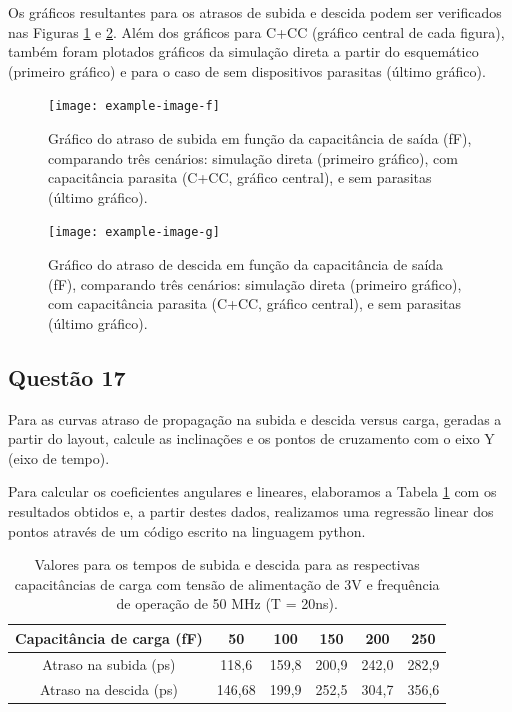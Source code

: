 \documentclass[12pt,a4paper]{article}
\begin{document}
Os gráficos resultantes para os atrasos de subida e descida podem ser verificados nas Figuras \ref{fig:delay_subida_cc} e \ref{fig:delay_descida_cc}. Além dos gráficos para C+CC (gráfico central de cada figura), também foram plotados gráficos da simulação direta a partir do esquemático (primeiro gráfico) e para o caso de sem dispositivos parasitas (último gráfico).

\begin{figure}[H]
    \centering
    \texttt{[image: example-image-f]}
    \caption{Gráfico do atraso de subida em função da capacitância de saída (fF), comparando três cenários: simulação direta (primeiro gráfico), com capacitância parasita (C+CC, gráfico central), e sem parasitas (último gráfico).}
    \label{fig:delay_subida_cc}
\end{figure}

\begin{figure}[H]
    \centering
    \texttt{[image: example-image-g]}
    \caption{Gráfico do atraso de descida em função da capacitância de saída (fF), comparando três cenários: simulação direta (primeiro gráfico), com capacitância parasita (C+CC, gráfico central), e sem parasitas (último gráfico).}
    \label{fig:delay_descida_cc}
\end{figure}

\subsection*{Questão 17}

Para as curvas atraso de propagação na subida e descida versus carga, geradas a partir do layout, calcule as inclinações e os pontos de cruzamento com o eixo Y (eixo de tempo).

Para calcular os coeficientes angulares e lineares, elaboramos a Tabela \ref{tab:delay_values} com os resultados obtidos e, a partir destes dados, realizamos uma regressão linear dos pontos através de um código escrito na linguagem python.

\begin{table}[H]
    \centering
    \caption{Valores para os tempos de subida e descida para as respectivas capacitâncias de carga com tensão de alimentação de 3V e frequência de operação de 50 MHz (T = 20ns).}
    \label{tab:delay_values}
    \begin{tabular}{cccccc}
        \toprule
        Capacitância de carga (fF) & 50 & 100 & 150 & 200 & 250 \\
        \midrule
        Atraso na subida (ps) & 118,6 & 159,8 & 200,9 & 242,0 & 282,9 \\
        Atraso na descida (ps) & 146,68 & 199,9 & 252,5 & 304,7 & 356,6 \\
        \bottomrule
    \end{tabular}
\end{table}
\end{document}
